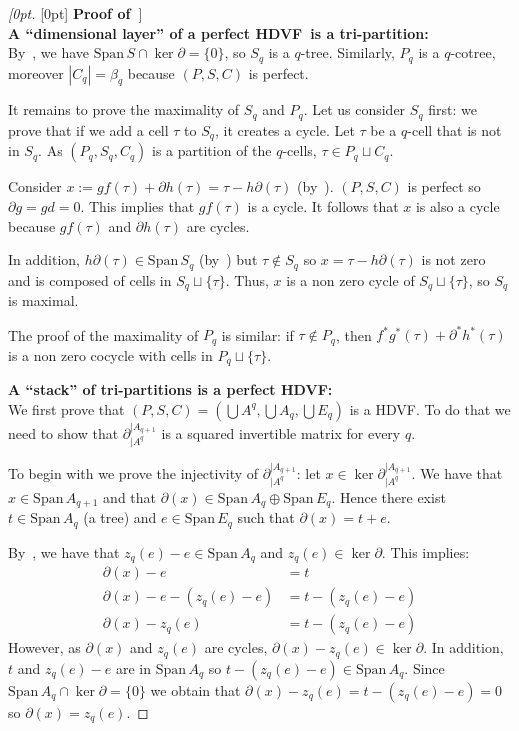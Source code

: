 \documentclass[runningheads]{llncs}
\newenvironment{delayedproof}[1]
 {\begin{proof}[\raisedtarget{#1}\textbf{Proof of~\Cref{#1}}]}
 {\end{proof}}
\newcommand{\raisedtarget}[1]{%
  \raisebox{\fontcharht\font`P}[0pt][0pt]{\hypertarget{#1}{}}%
}
\newcommand\Span{\mathrm{Span}\,}
\newcommand{\dr}{\partial}
\newcommand{\HC}{HDVF}
\begin{document}
\begin{delayedproof}{prop_hc-equiv-tri-partition}
    ~\\
    \textbf{A ``dimensional layer'' of a perfect \HC\ is a tri-partition:}\\
By~, we have $\Span S \cap \ker\dr = \{0\}$, so $S_q$ is a $q$-tree.
Similarly, $P_q$ is a $q$-cotree, moreover $|C_q|=\beta_q$ because $(P,S,C)$ is perfect.
    
    It remains to prove the maximality of $S_q$ and $P_q$.
    Let us consider $S_q$ first: we prove that if we add a cell $\tau$ to $S_q$, it creates a cycle.
    Let $\tau$ be a $q$-cell that is not in $S_q$.
    As $(P_q,S_q,C_q)$ is a partition of the $q$-cells, $\tau \in P_q\sqcup C_q$.
    
    Consider $x := gf(\tau)+\dr h(\tau) = \tau - h\dr(\tau)$ (by~).
    $(P,S,C)$ is perfect so $\dr g = gd = 0$.
    This implies that $gf(\tau)$ is a cycle.
    It follows that $x$ is also a cycle because $gf(\tau)$ and $\dr h(\tau)$ are cycles.

    In addition, $h\dr(\tau) \in \Span S_q$ (by~) but $\tau \notin S_q$ so $x= \tau - h\dr(\tau)$ is not zero and is composed of cells in $S_q\sqcup\{\tau\}$.
    Thus, $x$ is a non zero cycle of $S_q\sqcup\{\tau\}$, so $S_q$ is maximal.
    \smallskip
    
    The proof of the maximality of $P_q$ is similar:
    if $\tau \notin P_q$, then $f^\ast g^\ast(\tau)+\dr^\ast h^\ast(\tau)$ is a non zero cocycle with cells in $P_q\sqcup\{\tau\}$.
    
    \bigskip
    \noindent\textbf{A ``stack'' of tri-partitions is a perfect \HC:}\\
We first prove that $(P,S,C) = (\bigcup A^q, \bigcup A_q, \bigcup E_q)$ is a \HC.
    To do that we need to show that $\dr_{|A^q}^{|A_{q+1}}$ is a squared invertible matrix for every $q$.

    To begin with we prove the injectivity of $\dr_{|A^q}^{|A_{q+1}}$:
    let $x \in \ker \dr_{|A^q}^{|A_{q+1}}$.
    We have that $x \in \Span A_{q+1}$ and that $\dr(x) \in \Span A_q \oplus \Span E_q$.
    Hence there exist $t \in \Span A_q$ (a tree) and $e\in \Span E_q$ such that $\dr(x) = t+e$.

    By~, we have that $z_q(e)-e \in \Span A_q$ and $z_q(e)\in\ker\dr$.
    This implies:
    \begin{align*}
        \dr(x)-e &= t\\
        \dr(x)-e -(z_q(e)-e) &= t - (z_q(e)-e)\\
        \dr(x)-z_q(e) &= t - (z_q(e)-e)
    \end{align*}
    However, as $\dr(x)$ and $z_q(e)$ are cycles, $\dr(x)-z_q(e)\in \ker\dr$.
    In addition, $t$ and $z_q(e)-e$ are in $\Span A_q$ so $t - (z_q(e)-e)\in\Span A_q$.
    Since $\Span A_q \cap \ker\dr = \{0\}$ we obtain that $\dr(x)-z_q(e) = t - (z_q(e)-e) = 0$ so $\dr(x) = z_q(e)$.


\end{delayedproof}
\end{document}
